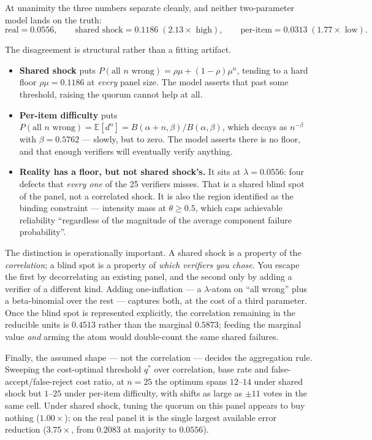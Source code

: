 \documentclass[11pt,a4paper]{article}
\begin{document}
At unanimity the three numbers separate cleanly, and neither two-parameter model
lands on the truth:
\[
\text{real} = 0.0556, \qquad
\text{shared shock} = 0.1186 \;(2.13\times\text{ high}), \qquad
\text{per-item} = 0.0313 \;(1.77\times\text{ low}).
\]

The disagreement is structural rather than a fitting artifact.

\begin{itemize}
\item \textbf{Shared shock} puts $P(\text{all } n \text{ wrong}) = \rho\mu + (1-\rho)\mu^{n}$,
  tending to a hard floor $\rho\mu = 0.1186$ at \emph{every} panel size. The model
  asserts that past some threshold, raising the quorum cannot help at all.
\item \textbf{Per-item difficulty} puts $P(\text{all } n \text{ wrong}) = \mathbb{E}[d^{n}] = B(\alpha+n,\beta)/B(\alpha,\beta)$,
  which decays as $n^{-\beta}$ with $\beta = 0.5762$ --- slowly, but to zero. The
  model asserts there is no floor, and that enough verifiers will eventually
  verify anything.
\item \textbf{Reality has a floor, but not shared shock's.} It sits at
  $\lambda = 0.0556$: four defects that \emph{every one} of the 25 verifiers
  misses. That is a shared blind spot of the panel, not a correlated shock. It is
  also the region \citet{eckhardt1985} identified as the binding constraint ---
  intensity mass at $\theta \geq 0.5$, which caps achievable reliability
  ``regardless of the magnitude of the average component failure probability''.
\end{itemize}

The distinction is operationally important. A shared shock is a property of the
\emph{correlation}; a blind spot is a property of \emph{which verifiers you
chose}. You escape the first by decorrelating an existing panel, and the second
only by adding a verifier of a different kind. Adding one-inflation --- a
$\lambda$-atom on ``all wrong'' plus a beta-binomial over the rest --- captures
both, at the cost of a third parameter. Once the blind spot is represented
explicitly, the correlation remaining in the reducible units is $0.4513$ rather
than the marginal $0.5873$; feeding the marginal value \emph{and} arming the atom
would double-count the same shared failures.

Finally, the assumed shape --- not the correlation --- decides the aggregation
rule. Sweeping the cost-optimal threshold $q^{*}$ over correlation, base rate and
false-accept/false-reject cost ratio, at $n = 25$ the optimum spans $12$--$14$
under shared shock but $1$--$25$ under per-item difficulty, with shifts as large
as $\pm 11$ votes in the same cell. Under shared shock, tuning the quorum on this
panel appears to buy nothing ($1.00\times$); on the real panel it is the single
largest available error reduction ($3.75\times$, from $0.2083$ at majority to
$0.0556$).
\end{document}
